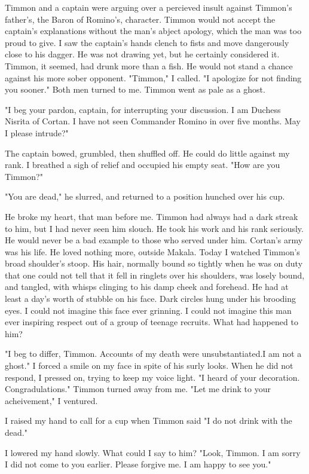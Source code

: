 \documentclass{article}
\begin{document}
Timmon and a captain were arguing over a percieved insult against Timmon's father's, the Baron of Romino's, character. Timmon would not accept the captain's explanations without the man's abject apology, which the man was too proud to give. I saw the captain's hands clench to fists and move dangerously close to his dagger. He was not drawing yet, but he certainly considered it. Timmon, it seemed, had drunk more than a fish. He would not stand a chance against his more sober opponent. "Timmon," I called. "I apologize for not finding you sooner." Both men turned to me. Timmon went as pale as a ghost.

"I beg your pardon, captain, for interrupting your discussion. I am Duchess Nisrita of Cortan. I have not seen Commander Romino in over five months. May I please intrude?"

The captain bowed, grumbled, then shuffled off. He could do little against my rank. I breathed a sigh of relief and occupied his empty seat. "How are you Timmon?"

"You are dead," he slurred, and returned to a position hunched over his cup.

He broke my heart, that man before me. Timmon had always had a dark streak to him, but I had never seen him slouch. He took his work and his rank seriously. He would never be a bad example to those who served under him. Cortan's army was his life. He loved nothing more, outside Makala. Today I watched Timmon's broad shoulder's stoop. His hair, normally bound so tightly when he was on duty that one could not tell that it fell in ringlets over his shoulders, was losely bound, and tangled, with whisps clinging to his damp cheek and forehead. He had at least a day's worth of stubble on his face. Dark circles hung under his brooding eyes. I could not imagine this face ever grinning. I could not imagine this man ever inspiring respect out of a group of teenage recruits. What had happened to him?

"I beg to differ, Timmon. Accounts of my death were unsubstantiated.I am not a ghost." I forced a smile on my face in spite of his surly looks. When he did not respond, I pressed on, trying to keep my voice light. "I heard of your decoration. Congradulations." Timmon turned away from me. "Let me drink to your acheivement," I ventured. 

I raised my hand to call for a cup when Timmon said "I do not drink with the dead."

I lowered my hand slowly. What could I say to him? "Look, Timmon. I am sorry I did not come to you earlier. Please forgive me. I am happy to see you."
\end{document}
